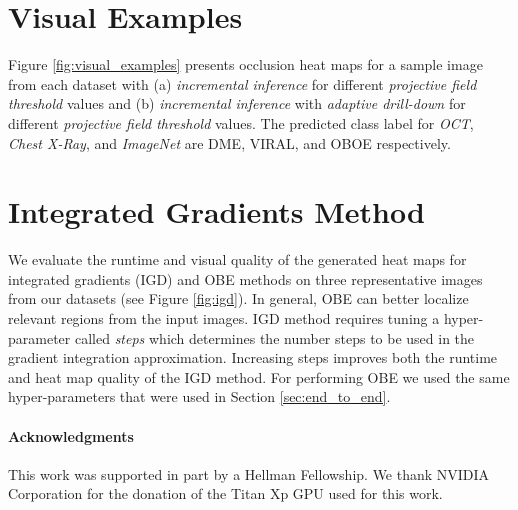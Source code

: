 \section{Visual Examples}\label{sec:visual_examples}

Figure \ref{fig:visual_examples} presents occlusion heat maps for a sample image from each dataset with (a) \textit{incremental inference} for different \textit{projective field threshold} values and (b) \textit{incremental inference} with \textit{adaptive drill-down} for different \textit{projective field threshold} values. The predicted class label for \textit{OCT}, \textit{Chest X-Ray}, and \textit{ImageNet} are DME, VIRAL, and OBOE respectively.


\section{Integrated Gradients Method}\label{sec:igd}
We evaluate the runtime and visual quality of the generated heat maps for integrated gradients (IGD) \cite{sundararajan2017axiomatic} and OBE methods on three representative images from our datasets (see Figure \ref{fig:igd}).
In general, OBE can better localize relevant regions from the input images.
IGD method requires tuning a hyper-parameter called \textit{steps} which determines the number steps to be used in the gradient integration approximation.
Increasing steps improves both the runtime and heat map quality of the IGD method.
For performing OBE we used the same hyper-parameters that were used in Section \ref{sec:end_to_end}.

\paragraph*{Acknowledgments} This work was supported in part by a Hellman Fellowship. We thank NVIDIA Corporation for the donation of the Titan Xp GPU used for this work.